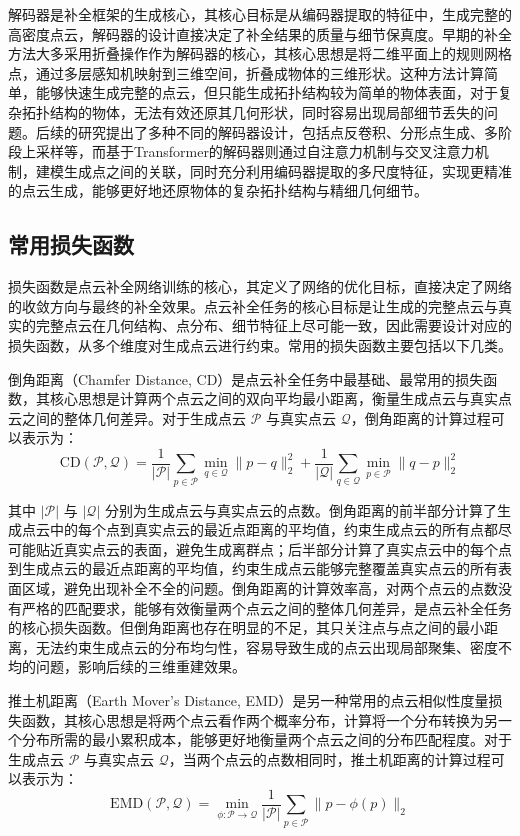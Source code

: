 解码器是补全框架的生成核心，其核心目标是从编码器提取的特征中，生成完整的高密度点云，解码器的设计直接决定了补全结果的质量与细节保真度。早期的补全方法大多采用折叠操作作为解码器的核心，其核心思想是将二维平面上的规则网格点，通过多层感知机映射到三维空间，折叠成物体的三维形状。这种方法计算简单，能够快速生成完整的点云，但只能生成拓扑结构较为简单的物体表面，对于复杂拓扑结构的物体，无法有效还原其几何形状，同时容易出现局部细节丢失的问题。后续的研究提出了多种不同的解码器设计，包括点反卷积、分形点生成、多阶段上采样等，而基于Transformer的解码器则通过自注意力机制与交叉注意力机制，建模生成点之间的关联，同时充分利用编码器提取的多尺度特征，实现更精准的点云生成，能够更好地还原物体的复杂拓扑结构与精细几何细节\cite{xiang2021snowflakenet}。

\subsection{常用损失函数}
损失函数是点云补全网络训练的核心，其定义了网络的优化目标，直接决定了网络的收敛方向与最终的补全效果。点云补全任务的核心目标是让生成的完整点云与真实的完整点云在几何结构、点分布、细节特征上尽可能一致，因此需要设计对应的损失函数，从多个维度对生成点云进行约束。常用的损失函数主要包括以下几类。

倒角距离（Chamfer Distance, CD）是点云补全任务中最基础、最常用的损失函数，其核心思想是计算两个点云之间的双向平均最小距离，衡量生成点云与真实点云之间的整体几何差异。对于生成点云 $\mathcal{P}$ 与真实点云 $\mathcal{Q}$，倒角距离的计算过程可以表示为：
\begin{equation}
\text{CD}(\mathcal{P}, \mathcal{Q}) = \frac{1}{|\mathcal{P}|} \sum_{p \in \mathcal{P}} \min_{q \in \mathcal{Q}} \| p - q \|_2^2 + \frac{1}{|\mathcal{Q}|} \sum_{q \in \mathcal{Q}} \min_{p \in \mathcal{P}} \| q - p \|_2^2
\end{equation}

其中 $|\mathcal{P}|$ 与 $|\mathcal{Q}|$ 分别为生成点云与真实点云的点数。倒角距离的前半部分计算了生成点云中的每个点到真实点云的最近点距离的平均值，约束生成点云的所有点都尽可能贴近真实点云的表面，避免生成离群点；后半部分计算了真实点云中的每个点到生成点云的最近点距离的平均值，约束生成点云能够完整覆盖真实点云的所有表面区域，避免出现补全不全的问题。倒角距离的计算效率高，对两个点云的点数没有严格的匹配要求，能够有效衡量两个点云之间的整体几何差异，是点云补全任务的核心损失函数。但倒角距离也存在明显的不足，其只关注点与点之间的最小距离，无法约束生成点云的分布均匀性，容易导致生成的点云出现局部聚集、密度不均的问题，影响后续的三维重建效果。

推土机距离（Earth Mover's Distance, EMD）是另一种常用的点云相似性度量损失函数，其核心思想是将两个点云看作两个概率分布，计算将一个分布转换为另一个分布所需的最小累积成本，能够更好地衡量两个点云之间的分布匹配程度。对于生成点云 $\mathcal{P}$ 与真实点云 $\mathcal{Q}$，当两个点云的点数相同时，推土机距离的计算过程可以表示为：
\begin{equation}
\text{EMD}(\mathcal{P}, \mathcal{Q}) = \min_{\phi: \mathcal{P} \to \mathcal{Q}} \frac{1}{|\mathcal{P}|} \sum_{p \in \mathcal{P}} \| p - \phi(p) \|_2
\end{equation}


